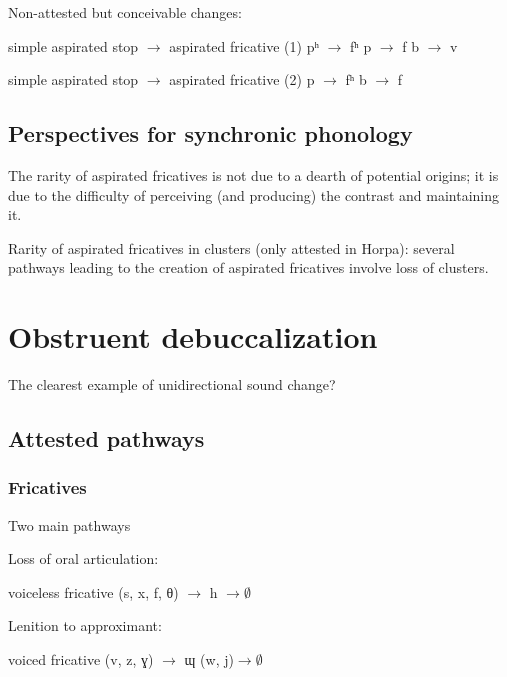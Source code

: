 \documentclass[oldfontcommands,oneside,a4paper,11pt]{article}
\begin{document}
Non-attested but conceivable changes:
\begin{exe}
\ex 
\glt simple aspirated stop $\rightarrow$ aspirated fricative (1)
\glt *pʰ $\rightarrow$ fʰ
\glt *p $\rightarrow$ f
\glt *b $\rightarrow$ v
\end{exe}

\begin{exe}
\ex 
\glt simple aspirated stop $\rightarrow$ aspirated fricative (2)
\glt *p $\rightarrow$ fʰ
\glt *b $\rightarrow$ f
\end{exe}

\subsection{Perspectives for synchronic phonology}
\begin{exe}
\ex 
\glt The rarity of aspirated fricatives is not due to a dearth of potential origins; it is due to the difficulty of perceiving (and producing) the contrast and maintaining it.
\end{exe}
\begin{exe}
\ex 
\glt Rarity of aspirated fricatives in clusters (only attested in Horpa): several pathways leading to the creation of aspirated fricatives involve loss of clusters.
\end{exe}


\section{Obstruent debuccalization}
The clearest example of unidirectional sound change?
\subsection{Attested pathways}

  \subsubsection{Fricatives}
Two main pathways

Loss of oral articulation:
\begin{exe}
\ex
\glt voiceless fricative (s, x, f, θ) $\rightarrow$ h $\rightarrow \emptyset$ 
\end{exe}

Lenition to approximant:
\begin{exe}
\ex
\glt voiced fricative (v, z, ɣ) $\rightarrow$ ɰ (w, j)$\rightarrow \emptyset$ 
\end{exe}
\end{document}
